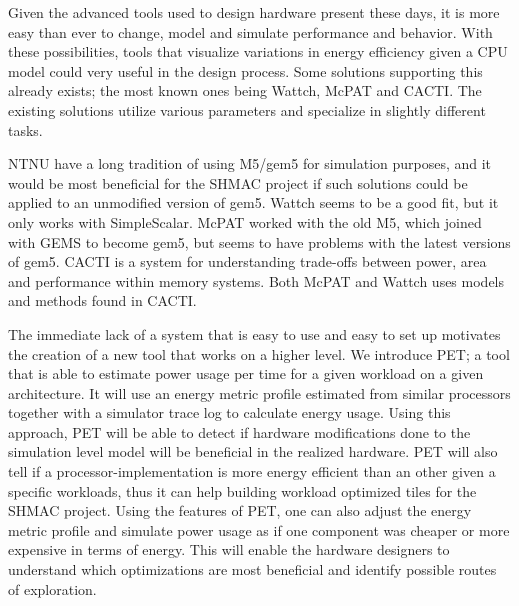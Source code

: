 Given the advanced tools used to design hardware present these days, it is more
easy than ever to change, model and simulate performance and behavior. With
these possibilities, tools that visualize variations in energy efficiency given
a CPU model could very useful in the design process. Some solutions supporting
this already exists; the most known ones being Wattch\cite{brooks2000wattch},
McPAT\cite{hpmcpat,li2013mcpat} and CACTI\cite{hpcacti}. The existing solutions
utilize various parameters and specialize in slightly different tasks.

NTNU have a long tradition of using M5/gem5 for simulation purposes, and it
would be most beneficial for the SHMAC project if such solutions could be
applied to an unmodified version of gem5. Wattch seems to be a good fit, but it
only works with SimpleScalar\cite{wattchanalysis}. McPAT worked with the old
M5\cite{m5mcpatparser}, which joined with GEMS to become gem5\cite{gem5hipeac},
but seems to have problems with the latest versions of
gem5\cite{mcpatgem5problems}. CACTI is a system for understanding trade-offs
between power, area and performance within memory
systems\cite{hpcacti,muralimanohar2010memory}. Both McPAT and Wattch uses models
and methods found in CACTI\cite{li2009mcpat}.

The immediate lack of a system that is easy to use and easy to set up motivates
the creation of a new tool that works on a higher level. We introduce PET; a
tool that is able to estimate power usage per time for a given workload on a
given architecture. It will use an energy metric profile estimated from similar
processors together with a simulator trace log to calculate energy usage. Using
this approach, PET will be able to detect if hardware modifications done to the
simulation level model will be beneficial in the realized hardware. PET will
also tell if a processor-implementation is more energy efficient than an other
given a specific workloads, thus it can help building workload optimized tiles
for the SHMAC project\cite{shmacwebpage}. Using the features of PET, one can
also adjust the energy metric profile and simulate power usage as if one
component was cheaper or more expensive in terms of energy. This will enable the
hardware designers to understand which optimizations are most beneficial and
identify possible routes of exploration.




